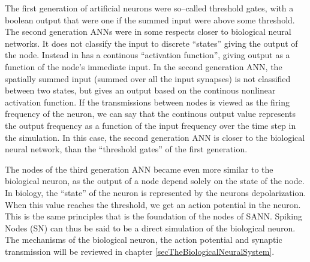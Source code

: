 The first generation of artificial neurons were so--called threshold gates, with a boolean output that were one if the summed input were above some threshold.
The second generation ANNs were in some respects closer to biological neural networks.%
It does not classify the input to discrete ``states'' giving the output of the node. 
Instead in has a continous ``activation function'', giving output as a function of the node's immediate input.
%
In the second generation ANN, the spatially summed input (summed over all the input synapses) is not classified between two states, but gives an output based on the continous nonlinear activation function.
If the transmissions between nodes is viewed as the firing frequency of the neuron, we can say that the continous output value represents the output frequency as a function of the input frequency over the time step in the simulation.
In this case, the second generation ANN is closer to the biological neural network, than the ``threshold gates'' of the first generation. %

The nodes of the third generation ANN became even more similar to the biological neuron, as the output of a node depend solely on the state of the node.
In biology, the ``state'' of the neuron is represented by the neurons depolarization.
When this value reaches the threshold, we get an action potential in the neuron.
This is the same principles that is the foundation of the nodes of SANN. Spiking Nodes (SN) can thus be said to be a direct simulation of the biological neuron.
The mechanisms of the biological neuron, the action potential and synaptic transmission will be reviewed in chapter \ref{secTheBiologicalNeuralSystem}.

